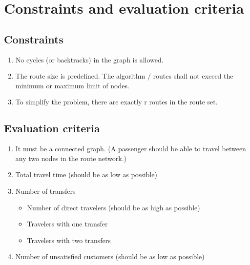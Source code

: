 \section{Constraints and evaluation criteria}

\subsection{Constraints}
\begin{enumerate}
\item \label{itm:constraintCycles} No cycles (or backtracks) in the graph is allowed.
\item \label{itm:constraintRouteSize} The route size is predefined. The algorithm / routes shall not exceed the minimum or maximum limit of nodes.
\item \label{itm:constraintRouteSet} To simplify the problem, there are exactly r routes in the route set.
\end{enumerate}

\subsection{Evaluation criteria}
\begin{enumerate}
\item \label{itm:criteriaConnectedGraph} It must be a connected graph. (A passenger should be able to travel between any two nodes in the route network.) 
\item \label{itm:criteriaTotalTravelTime} Total travel time (should be as low as possible)
\item \label{itm:f2} Number of transfers
\begin{itemize}
\item Number of direct travelers (should be as high as possible)
\item Travelers with one transfer
\item Travelers with two transfers
\end{itemize}
\item \label{itm:TODO} Number of unsatisfied customers (should be as low as possible)
\end{enumerate}

